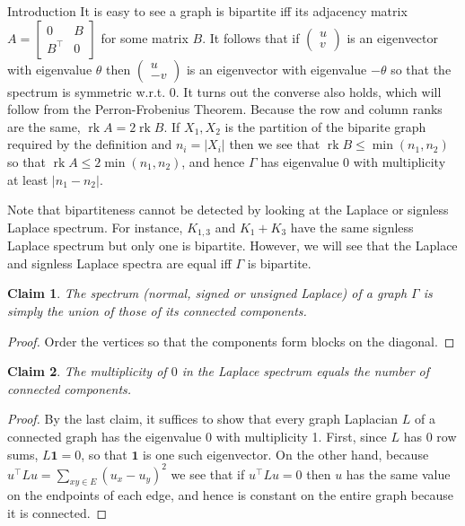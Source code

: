 \documentclass{article}
\DeclareMathOperator{\rk}{rk}
\newtheorem{claim}{Claim}
\begin{document}
\begin{section}{Introduction}
  It is easy to see a graph is bipartite iff its adjacency matrix $A = \begin{bmatrix} 0 & B \\ B^\intercal & 0 \end{bmatrix}$ for some matrix $B$.
    It follows that if $\begin{pmatrix} u \\ v \end{pmatrix}$ is an eigenvector with eigenvalue $\theta$ then $\begin{pmatrix} u \\ -v \end{pmatrix}$ is an eigenvector with eigenvalue $-\theta$ so that the spectrum is symmetric w.r.t. 0.
    It turns out the converse also holds, which will follow from the Perron-Frobenius Theorem.
    Because the row and column ranks are the same, $\rk A = 2\rk B$.
    If $X_1, X_2$ is the partition of the biparite graph required by the definition and $n_i = |X_i|$ then we see that $\rk B \leq \min(n_1,n_2)$ so that $\rk A \leq 2\min(n_1,n_2)$, and hence $\Gamma$ has eigenvalue 0 with multiplicity at least $|n_1 - n_2|$.
    
    Note that bipartiteness cannot be detected by looking at the Laplace or signless Laplace spectrum. For instance, $K_{1,3}$ and $K_1 + K_3$ have the same signless Laplace spectrum but only one is bipartite.
    However, we will see that the Laplace and signless Laplace spectra are equal iff $\Gamma$ is bipartite.

    \begin{claim}
      The spectrum (normal, signed or unsigned Laplace) of a graph $\Gamma$ is simply the union of those of its connected components.
    \end{claim}
    \begin{proof}
      Order the vertices so that the components form blocks on the diagonal.
    \end{proof}
    \begin{claim}
      The multiplicity of $0$ in the Laplace spectrum equals the number of connected components.
    \end{claim}
    \begin{proof}
      By the last claim, it suffices to show that every graph Laplacian $L$ of a connected graph has the eigenvalue $0$ with multiplicity 1.
      First, since $L$ has 0 row sums, $L\mathbf 1 = 0$, so that $\mathbf 1$ is one such eigenvector.
      On the other hand, because $u^\intercal L u = \sum_{xy \in E}(u_x - u_y)^2$ we see that if $u^\intercal L u = 0$ then $u$ has the same value on the endpoints of each edge, and hence is constant on the entire graph because it is connected.
    \end{proof}


\end{section}
\end{document}
